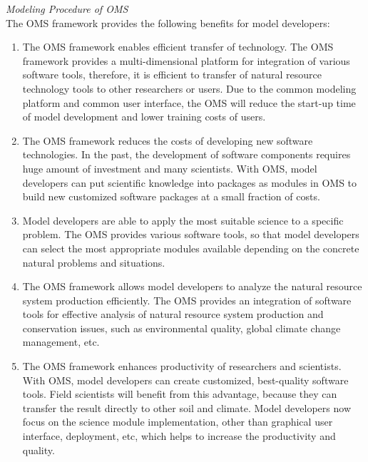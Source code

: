 \emph{Modeling Procedure of OMS}\\
The OMS framework provides the following benefits for model developers:
\begin{enumerate}
\item The OMS framework enables efficient transfer of technology. The OMS framework provides a multi-dimensional platform for integration of various software tools, therefore, it is efficient to transfer of natural resource technology tools to other researchers or users. Due to the common modeling platform and common user interface, the OMS will reduce the start-up time of model development and lower training costs of users.

\item The OMS framework reduces the costs of developing new software technologies. In the past, the development of software components requires huge amount of investment and many scientists. With OMS, model developers can put scientific knowledge into packages as modules in OMS to build new customized software packages at a small fraction of costs.

\item Model developers are able to apply the most suitable science to a specific problem. The OMS provides various software tools, so that model developers can select the most appropriate modules available depending on the concrete natural problems and situations.

\item The OMS framework allows model developers to analyze the natural resource system production efficiently. The OMS provides an integration of software tools for effective analysis of natural resource system production and conservation issues, such as environmental quality, global climate change management, etc.

\item The OMS framework enhances productivity of researchers and scientists. With OMS, model developers can create customized, best-quality software tools. Field scientists will benefit from this advantage, because they can transfer the result directly to other soil and climate. Model developers now focus on the science module implementation, other than graphical user interface, deployment, etc, which helps to increase the productivity and quality. 
\end{enumerate}

